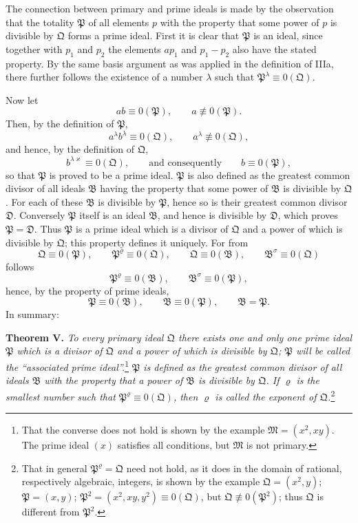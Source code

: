 \documentclass[11pt]{article}
\newcommand{\ideal}[1]{\mathfrak{#1}}
\begin{document}
The connection between primary and prime ideals is made by the observation that the totality $\ideal P$ of all elements $p$ with the property that some power of $p$ is divisible by $\ideal Q$ forms a prime ideal. First it is clear that $\ideal P$ is an ideal, since together with $p_1$ and $p_2$ the elements $ap_1$ and $p_1-p_2$ also have the stated property. By the same basis argument as was applied in the definition of IIIa, there further follows the existence of a number $\lambda$ such that $\ideal P^\lambda\equiv0(\ideal Q)$.

Now let
\[
 ab\equiv0(\ideal P),\qquad a\not\equiv0(\ideal P).
\]
Then, by the definition of $\ideal P$,
\[
 a^\lambda b^\lambda\equiv0(\ideal Q),\qquad a^\lambda\not\equiv0(\ideal Q),
\]
and hence, by the definition of $\ideal Q$,
\[
 b^{\lambda\varkappa}\equiv0(\ideal Q),\qquad\text{and consequently}\qquad b\equiv0(\ideal P),
\]
so that $\ideal P$ is proved to be a prime ideal. $\ideal P$ is also defined as the greatest common divisor of all ideals $\ideal B$ having the property that some power of $\ideal B$ is divisible by $\ideal Q$. For each of these $\ideal B$ is divisible by $\ideal P$, hence so is their greatest common divisor $\ideal D$. Conversely $\ideal P$ itself is an ideal $\ideal B$, and hence is divisible by $\ideal D$, which proves $\ideal P=\ideal D$. Thus $\ideal P$ is a prime ideal which is a divisor of $\ideal Q$ and a power of which is divisible by $\ideal Q$; this property defines it uniquely. For from
\[
 \ideal Q\equiv0(\ideal P),\qquad \ideal P^\varrho\equiv0(\ideal Q),
 \qquad
 \ideal Q\equiv0(\ideal B),\qquad \ideal B^\sigma\equiv0(\ideal Q)
\]
follows
\[
 \ideal P^\varrho\equiv0(\ideal B),\qquad \ideal B^\sigma\equiv0(\ideal P),
\]
hence, by the property of prime ideals,
\[
 \ideal P\equiv0(\ideal B),\qquad \ideal B\equiv0(\ideal P),\qquad \ideal B=\ideal P.
\]
In summary:

\textbf{Theorem V.} \emph{To every primary ideal $\ideal Q$ there exists one and only one prime ideal $\ideal P$ which is a divisor of $\ideal Q$ and a power of which is divisible by $\ideal Q$; $\ideal P$ will be called the ``associated prime ideal''.}\footnote{That the converse does not hold is shown by the example $\ideal M=(x^2,xy)$. The prime ideal $(x)$ satisfies all conditions, but $\ideal M$ is not primary.} \emph{$\ideal P$ is defined as the greatest common divisor of all ideals $\ideal B$ with the property that a power of $\ideal B$ is divisible by $\ideal Q$. If $\varrho$ is the smallest number such that $\ideal P^\varrho\equiv0(\ideal Q)$, then $\varrho$ is called the exponent of $\ideal Q$.}\footnote{That in general $\ideal P^\varrho=\ideal Q$ need not hold, as it does in the domain of rational, respectively algebraic, integers, is shown by the example $\ideal Q=(x^2,y)$; $\ideal P=(x,y)$; $\ideal P^2=(x^2,xy,y^2)\equiv0(\ideal Q)$, but $\ideal Q\not\equiv0(\ideal P^2)$; thus $\ideal Q$ is different from $\ideal P^2$.}
\end{document}
